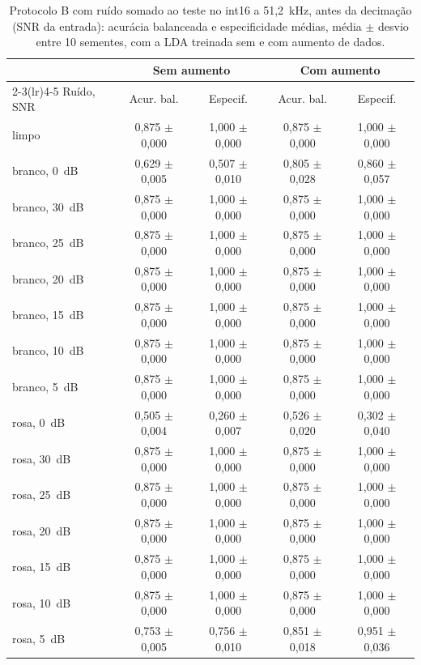 \begin{table}[H]
\centering
\caption{Protocolo B com ruído somado ao teste no int16 a 51,2~kHz, antes da decimação (SNR da entrada): acurácia balanceada e especificidade médias, média $\pm$ desvio entre 10 sementes, com a LDA treinada sem e com aumento de dados.}
\label{tab:varreduraSNR}
\footnotesize
\begin{tabular}{lcccc}
\toprule
 & \multicolumn{2}{c}{Sem aumento} & \multicolumn{2}{c}{Com aumento} \\
\cmidrule(lr){2-3}\cmidrule(lr){4-5}
Ruído, SNR & Acur. bal. & Especif. & Acur. bal. & Especif. \\
\midrule
limpo & 0,875 $\pm$ 0,000 & 1,000 $\pm$ 0,000 & 0,875 $\pm$ 0,000 & 1,000 $\pm$ 0,000 \\
branco, 0~dB & 0,629 $\pm$ 0,005 & 0,507 $\pm$ 0,010 & 0,805 $\pm$ 0,028 & 0,860 $\pm$ 0,057 \\
branco, 30~dB & 0,875 $\pm$ 0,000 & 1,000 $\pm$ 0,000 & 0,875 $\pm$ 0,000 & 1,000 $\pm$ 0,000 \\
branco, 25~dB & 0,875 $\pm$ 0,000 & 1,000 $\pm$ 0,000 & 0,875 $\pm$ 0,000 & 1,000 $\pm$ 0,000 \\
branco, 20~dB & 0,875 $\pm$ 0,000 & 1,000 $\pm$ 0,000 & 0,875 $\pm$ 0,000 & 1,000 $\pm$ 0,000 \\
branco, 15~dB & 0,875 $\pm$ 0,000 & 1,000 $\pm$ 0,000 & 0,875 $\pm$ 0,000 & 1,000 $\pm$ 0,000 \\
branco, 10~dB & 0,875 $\pm$ 0,000 & 1,000 $\pm$ 0,000 & 0,875 $\pm$ 0,000 & 1,000 $\pm$ 0,000 \\
branco, 5~dB & 0,875 $\pm$ 0,000 & 1,000 $\pm$ 0,000 & 0,875 $\pm$ 0,000 & 1,000 $\pm$ 0,000 \\
rosa, 0~dB & 0,505 $\pm$ 0,004 & 0,260 $\pm$ 0,007 & 0,526 $\pm$ 0,020 & 0,302 $\pm$ 0,040 \\
rosa, 30~dB & 0,875 $\pm$ 0,000 & 1,000 $\pm$ 0,000 & 0,875 $\pm$ 0,000 & 1,000 $\pm$ 0,000 \\
rosa, 25~dB & 0,875 $\pm$ 0,000 & 1,000 $\pm$ 0,000 & 0,875 $\pm$ 0,000 & 1,000 $\pm$ 0,000 \\
rosa, 20~dB & 0,875 $\pm$ 0,000 & 1,000 $\pm$ 0,000 & 0,875 $\pm$ 0,000 & 1,000 $\pm$ 0,000 \\
rosa, 15~dB & 0,875 $\pm$ 0,000 & 1,000 $\pm$ 0,000 & 0,875 $\pm$ 0,000 & 1,000 $\pm$ 0,000 \\
rosa, 10~dB & 0,875 $\pm$ 0,000 & 1,000 $\pm$ 0,000 & 0,875 $\pm$ 0,000 & 1,000 $\pm$ 0,000 \\
rosa, 5~dB & 0,753 $\pm$ 0,005 & 0,756 $\pm$ 0,010 & 0,851 $\pm$ 0,018 & 0,951 $\pm$ 0,036 \\
\bottomrule
\end{tabular}
\end{table}

